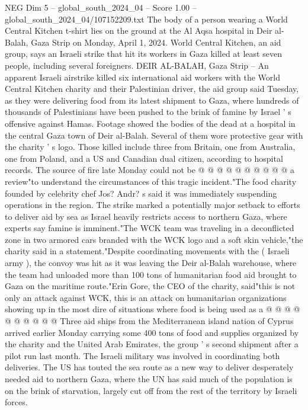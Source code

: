 \begin{textsample}{NEG Dim 5 – global\_south\_2024\_04 – Score 1.00 – global\_south\_2024\_04/107152209.txt}  \label{ex:f5_neg_182}
The body of a person wearing a World Central Kitchen t-shirt lies on the ground at the Al Aqsa hospital in Deir al-Balah, Gaza Strip on Monday, April 1, 2024.
World Central Kitchen, an aid group, says an Israeli strike that hit its workers in Gaza killed at least seven people, including several foreigners.
DEIR AL-BALAH, Gaza Strip -- An apparent Israeli airstrike killed six international aid workers with the World Central Kitchen charity and their Palestinian driver, the aid group said Tuesday, as they were delivering food from its latest shipment to Gaza, where hundreds of thousands of Palestinians have been pushed to the brink of famine by Israel ' s offensive against Hamas.
Footage showed the bodies of the dead at a hospital in the central Gaza town of Deir al-Balah.
Several of them wore protective gear with the charity ' s logo.
Those killed include three from Britain, one from Australia, one from Poland, and a US and Canadian dual citizen, according to hospital records.
The source of fire late Monday could not be @ @ @ @ @ @ @ @ @ @ a review"to understand the circumstances of this tragic incident."The food charity founded by celebrity chef Jos?
Andr? s said it was immediately suspending operations in the region.
The strike marked a potentially major setback to efforts to deliver aid by sea as Israel heavily restricts access to northern Gaza, where experts say famine is imminent."The WCK team was traveling in a deconflicted zone in two armored cars branded with the WCK logo and a soft skin vehicle,"the charity said in a statement."Despite coordinating movements with the ( Israeli army ), the convoy was hit as it was leaving the Deir al-Balah warehouse, where the team had unloaded more than 100 tons of humanitarian food aid brought to Gaza on the maritime route."Erin Gore, the CEO of the charity, said"this is not only an attack against WCK, this is an attack on humanitarian organizations showing up in the most dire of situations where food is being used as a @ @ @ @ @ @ @ @ @ @ Three aid ships from the Mediterranean island nation of Cyprus arrived earlier Monday carrying some 400 tons of food and supplies organized by the charity and the United Arab Emirates, the group ' s second shipment after a pilot run last month.
The Israeli military was involved in coordinating both deliveries.
The US has touted the sea route as a new way to deliver desperately needed aid to northern Gaza, where the UN has said much of the population is on the brink of starvation, largely cut off from the rest of the territory by Israeli forces.

\end{textsample}
